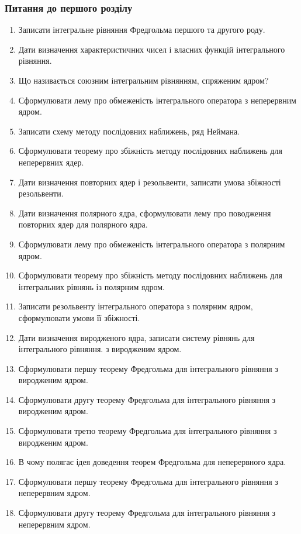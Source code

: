\subsubsection{Питання до першого розділу}
\begin{enumerate}
	\item Записати інтегральне рівняння Фредгольма першого та другого роду.
	\item Дати визначення характеристичних чисел і власних функцій інтегрального рівняння.
	\item Що називається союзним інтегральним рівнянням, спряженим ядром?
	\item Сформулювати лему про обмеженість інтегрального оператора з неперервним ядром.
	\item Записати схему методу послідовних наближень, ряд Неймана.
	\item Сформулювати теорему про збіжність методу послідовних наближень для неперервних ядер.
	\item Дати визначення повторних ядер і резольвенти, записати умова збіжності резольвенти.
	\item Дати визначення полярного ядра, сформулювати лему про поводження повторних ядер для полярного ядра.
	\item Сформулювати лему про обмеженість інтегрального оператора з полярним ядром.
	\item Сформулювати теорему про збіжність методу послідовних наближень для інтегральних рівнянь із полярним ядром.
	\item Записати резольвенту інтегрального оператора з полярним ядром, сформулювати умови її збіжності.
	\item Дати визначення виродженого ядра, записати систему рівнянь для інтегрального рівняння. з виродженим ядром.
	\item Сформулювати першу теорему Фредгольма для інтегрального рівняння з виродженим ядром.
	\item Сформулювати другу теорему Фредгольма для інтегрального рівняння з виродженим ядром.
	\item Сформулювати третю теорему Фредгольма для інтегрального рівняння з виродженим ядром.
	\item В чому полягає ідея доведення теорем Фредгольма для неперервного ядра.
	\item Сформулювати першу теорему Фредгольма для інтегрального рівняння з неперервним ядром.
	\item Сформулювати другу теорему Фредгольма для інтегрального рівняння з неперервним ядром.

\end{enumerate}
